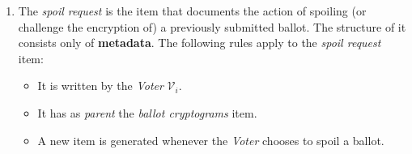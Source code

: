 \begin{enumerate}
    \item
        The \textit{spoil request} is the item that documents the action of spoiling (or challenge the encryption of) a previously submitted ballot. The structure of it consists only of \textbf{metadata}. The following rules apply to the \textit{spoil request} item:
        \begin{itemize}
            \item It is written by the \textit{Voter} $\mathcal{V}_i$.
            \item It has as \textit{parent} the \textit{ballot cryptograms} item.
            \item A new item is generated whenever the \textit{Voter} chooses to spoil a ballot.
        \end{itemize}
\end{enumerate}

